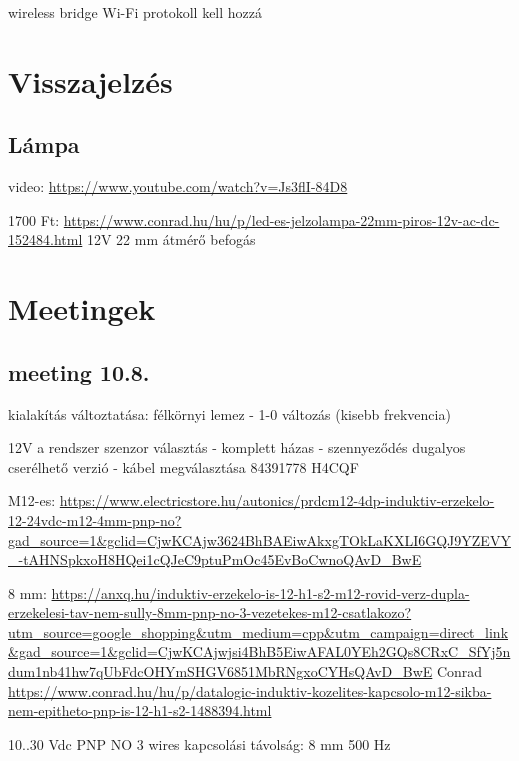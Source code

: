 \documentclass{article}
\begin{document}
	wireless bridge
	Wi-Fi protokoll kell hozzá
		
	
	\section{Visszajelzés}
	
	\subsection{Lámpa}
	
	video: \url{https://www.youtube.com/watch?v=Js3flI-84D8}

	1700 Ft: \url{https://www.conrad.hu/hu/p/led-es-jelzolampa-22mm-piros-12v-ac-dc-152484.html}
	12V
	22 mm átmérő befogás
	
	
	\section{Meetingek}
	
	\subsection{meeting 10.8.}
	
	kialakítás változtatása: félkörnyi lemez - 1-0 változás (kisebb frekvencia)
	
	12V a rendszer
	szenzor választás - komplett házas - szennyeződés
	dugalyos cserélhető verzió - kábel megválasztása
	84391778 H4CQF
	
	M12-es: \url{https://www.electricstore.hu/autonics/prdcm12-4dp-induktiv-erzekelo-12-24vdc-m12-4mm-pnp-no?gad_source=1&gclid=CjwKCAjw3624BhBAEiwAkxgTOkLaKXLI6GQJ9YZEVY_-tAHNSpkxoH8HQei1cQJeC9ptuPmOc45EvBoCwnoQAvD_BwE}
	
	8 mm: \url{https://anxq.hu/induktiv-erzekelo-is-12-h1-s2-m12-rovid-verz-dupla-erzekelesi-tav-nem-sully-8mm-pnp-no-3-vezetekes-m12-csatlakozo?utm_source=google_shopping&utm_medium=cpp&utm_campaign=direct_link&gad_source=1&gclid=CjwKCAjwjsi4BhB5EiwAFAL0YEh2GQs8CRxC_SfYj5ndum1nb41hw7qUbFdcOHYmSHGV6851MbRNgxoCYHsQAvD_BwE}
	Conrad
	\url{https://www.conrad.hu/hu/p/datalogic-induktiv-kozelites-kapcsolo-m12-sikba-nem-epitheto-pnp-is-12-h1-s2-1488394.html}
	
	10..30 Vdc
	PNP NO
	3 wires
	kapcsolási távolság: 8 mm
	500 Hz
	
\end{document}

